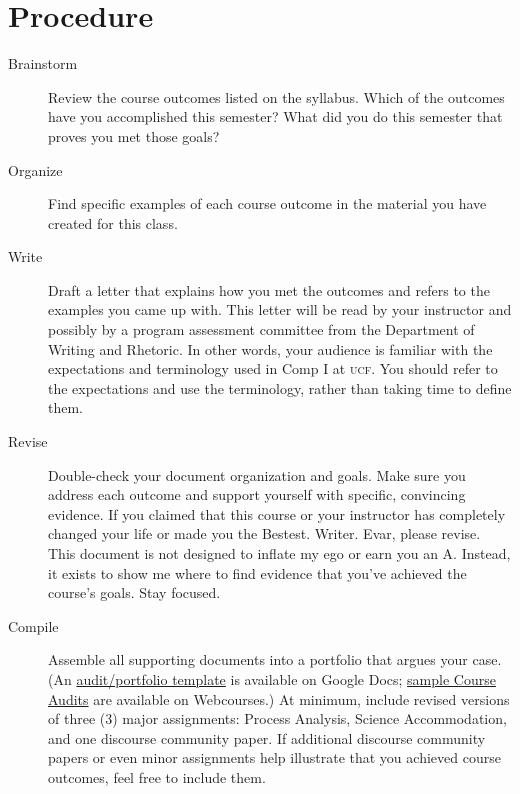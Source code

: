 \documentclass[9pt,twocolumn,oneside]{amsart}	%
\begin{document}
\section{Procedure} %
\label{sec:procedure}
\begin{description}
	\item[Brainstorm] Review the course outcomes listed on the syllabus. Which of the outcomes have you accomplished this semester? What did you do this semester that proves you met those goals?
	\item[Organize] Find specific examples of each course outcome in the material you have created for this class.
	\item[Write] Draft a letter that explains how you met the outcomes and refers to the examples you came up with. This letter will be read by your instructor and possibly by a program assessment committee from the Department of Writing and Rhetoric. In other words, your audience is familiar with the expectations and terminology used in Comp I at \textsc{ucf}. You should refer to the expectations and use the terminology, rather than taking time to define them.
	\item[Revise] Double-check your document organization and goals. Make sure you address each outcome and support yourself with specific, convincing evidence. If you claimed that this course or your instructor has completely changed your life or made you the Bestest. Writer. Evar\texttrademark{}, please revise. This document is not designed to inflate my ego or earn you an A. Instead, it exists to show me where to find evidence that you've achieved the course's goals. Stay focused.
	\item[Compile] Assemble all supporting documents into a portfolio that argues your case. (An \href{https://docs.google.com/document/d/1n3Pm7OlCYKaHclO51UotlhfNRfp5Zz5fynGeNpKABvI/edit?usp=sharing}{audit/portfolio template} is available on Google Docs; \href{https://webcourses.ucf.edu/courses/1009451/files#ENC1101_CMB-14Spring%2FFinal%20Portfolio%2FStudent%20Samples%20from%201102}{sample Course Audits} are available on Webcourses.) At minimum, include revised versions of three (3) major assignments: Process Analysis, Science Accommodation, and one discourse community paper. If additional discourse community papers or even minor assignments help illustrate that you achieved course outcomes, feel free to include them.
\end{description}
\end{document}
